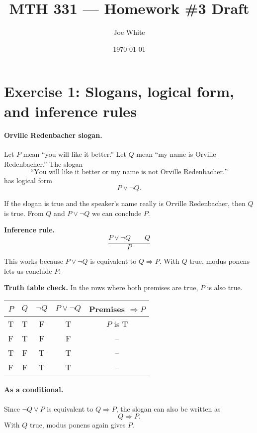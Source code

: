 \documentclass[11pt]{article}
\title{MTH 331 — Homework \#3 Draft}
\author{Joe White}
\date{\today}
\begin{document}
\maketitle

\section*{Exercise 1: Slogans, logical form, and inference rules}

\paragraph{Orville Redenbacher slogan.}
Let $P$ mean “you will like it better.” Let $Q$ mean “my name is Orville Redenbacher.”  
The slogan
\[
\text{``You will like it better or my name is not Orville Redenbacher.''}
\]
has logical form
\[
P \lor \neg Q.
\]

If the slogan is true and the speaker’s name really is Orville Redenbacher, then $Q$ is true. From $Q$ and $P\lor\neg Q$ we can conclude $P$.

\medskip
\noindent\textbf{Inference rule.}
\[
\frac{P\lor\neg Q \quad\quad Q}{P}
\]

This works because $P\lor\neg Q$ is equivalent to $Q\Rightarrow P$. With $Q$ true, modus ponens lets us conclude $P$.

\medskip
\noindent\textbf{Truth table check.}  
In the rows where both premises are true, $P$ is also true.

\begin{center}
\renewcommand{\arraystretch}{1.15}
\begin{tabular}{|c|c|c|c|c|}
\hline
$P$ & $Q$ & $\neg Q$ & $P \lor \neg Q$ & Premises $\Rightarrow P$ \\
\hline
T & T & F & T & $P$ is T \\
F & T & F & F & -- \\
T & F & T & T & -- \\
F & F & T & T & -- \\
\hline
\end{tabular}
\end{center}

\paragraph{As a conditional.}
Since $\neg Q \lor P$ is equivalent to $Q \Rightarrow P$, the slogan can also be written as
\[
Q \Rightarrow P.
\]
With $Q$ true, modus ponens again gives $P$.
\end{document}
